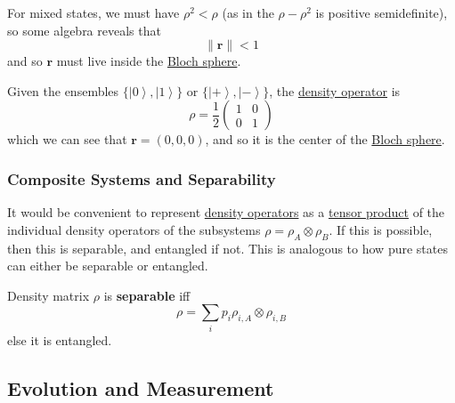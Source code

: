 \documentclass{article}
\newcommand{\ket}[1]{\ensuremath{\left|#1\right\rangle}}
\newcounter{definition}[section]
\newcounter{example}[section]
\begin{document}
      For mixed states, we must have $\rho^2 < \rho$ (as in the $\rho - \rho^2$ is positive semidefinite), so some algebra reveals that 
      \begin{equation}
        \|\mathbf{r}\| < 1
      \end{equation}
      and so $\mathbf{r}$ must live inside the \hyperref[def:bloch-sphere]{Bloch sphere}.

      \begin{example}
        \label{ex:pauli-decomposition-of-maximally-mixed-state}
        Given the ensembles $\{\ket{0}, \ket{1}\}$ or $\{\ket{+}, \ket{-}\}$, the \hyperref[def:density-operator]{density operator} is 
        \begin{equation}
          \rho = \frac{1}{2} \begin{pmatrix} 1 & 0 \\ 0 & 1 \end{pmatrix}
        \end{equation}
        which we can see that $\mathbf{r} = (0, 0, 0)$, and so it is the center of the \hyperref[def:bloch-sphere]{Bloch sphere}. 
      \end{example}

    \subsubsection{Composite Systems and Separability} 
      
      It would be convenient to represent \hyperref[def:density-operator]{density operators} as a \hyperref[sm-def:tensor-product]{tensor product} of the individual density operators of the subsystems $\rho = \rho_A \otimes \rho_B$. If this is possible, then this is separable, and entangled if not. This is analogous to how pure states can either be separable or entangled. 

      \begin{definition}[Separable]
        \label{def:separable}
        Density matrix $\rho$ is \textbf{separable} iff
        \begin{equation}
          \rho = \sum_i p_i \rho_{i, A} \otimes \rho_{i, B}
        \end{equation}
        else it is entangled. 
      \end{definition}

  \subsection{Evolution and Measurement}
\end{document}
